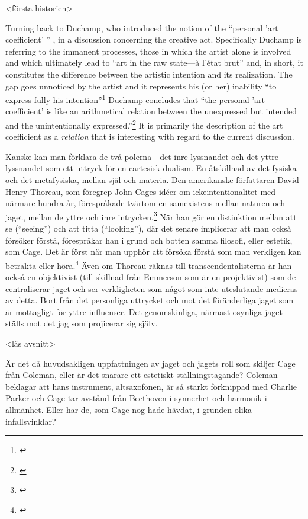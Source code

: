 \documentclass[a4paper]{article}
\begin{document}
<första historien>

Turning back to Duchamp, who introduced the notion of the ``personal
'art coefficient' '' , in a discussion concerning the creative
act. Specifically Duchamp is referring to the immanent processes,
those in which the artist alone is involved and which ultimately lead
to ``art in the raw state---\`{a} l'\'{e}tat brut'' and, in short, it
constitutes the difference between the artistic intention and its
realization. The gap goes unnoticed by the artist and it represents
his (or her) inability ``to express fully his
intention''\footnote{\citet{duchamps57}} Duchamp concludes that ``the personal
'art coefficient' is like an arithmetical relation between the
unexpressed but intended and the unintentionally
expressed.''\footnote{\citet{duchamps57}} It is primarily the description of
the art coefficient as a \emph{relation} that is interesting with
regard to the current discussion.

Kanske kan man förklara de två polerna - det inre lyssnandet och det yttre lyssnandet som ett uttryck för en cartesisk dualism. En åtskillnad av det fysiska och det metafysiska, mellan själ och materia. Den amerikanske författaren David Henry Thoreau, som föregrep John Cages idéer om ickeintentionalitet med närmare hundra år, förespråkade tvärtom en samexistens mellan naturen och jaget, mellan de yttre och inre intrycken.\footnote{\citet[s.37]{shultis98}} När han gör en distinktion mellan att se (``seeing'') och att titta (``looking''), där det senare implicerar att man också försöker förstå, förespråkar han i grund och botten samma filosofi, eller estetik, som Cage. Det är först när man upphör att försöka förstå som man verkligen kan betrakta eller höra.\footnote{\citet{thoreau41}} Även om Thoreau räknas till transcendentalisterna är han också en objektivist (till skillnad från Emmerson som är en projektivist) som de-centraliserar jaget och ser verkligheten som något som inte uteslutande medieras av detta. Bort från det personliga uttrycket och mot det föränderliga jaget som är mottagligt för yttre influenser. Det genomskinliga, närmast osynliga jaget ställs mot det jag som projicerar sig själv.

<läs avsnitt>

Är det då huvudsakligen uppfattningen av jaget och jagets roll som skiljer Cage från Coleman, eller är det snarare ett estetiskt ställningstagande? Coleman beklagar att hans instrument, altsaxofonen, är så starkt förknippad med Charlie Parker och Cage tar avstånd från Beethoven i synnerhet och harmonik i allmänhet. Eller har de, som Cage nog hade hävdat,  i grunden olika infallsvinklar?
\end{document}
